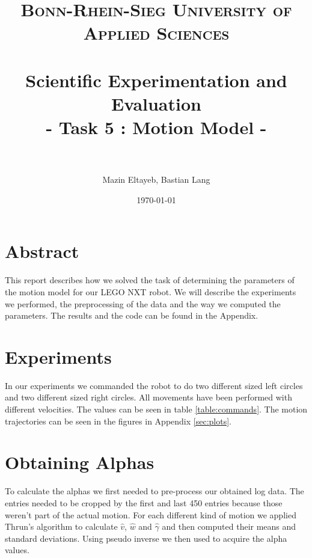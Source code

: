 \documentclass[paper=a4, fontsize=11pt]{scrartcl} %
\title{	
\normalfont \normalsize 
\textsc{Bonn-Rhein-Sieg University of Applied Sciences} \\ [25pt] %
\horrule{0.5pt} \\[0.4cm] %
\huge Scientific Experimentation and Evaluation\\
- Task 5 : Motion Model - \\ 
\horrule{2pt} \\[0.5cm] %
}
\author{Mazin Eltayeb, Bastian Lang} %
\date{\normalsize\today} %
\numberwithin{equation}{section} %
\numberwithin{figure}{section} %
\numberwithin{table}{section} %
\begin{document}
\maketitle %

\tableofcontents
\newpage

\section{Abstract}
This report describes how we solved the task of determining the parameters of the motion model for our LEGO NXT robot. We will describe the experiments we performed, the preprocessing of the data and the way we computed the parameters. The results and the code can be found in the Appendix.

\section{Experiments}
In our experiments we commanded the robot to do two different sized left circles and two different sized right circles. All movements have been performed with different velocities. The values can be seen in table \ref{table:commands}. The motion trajectories can be seen in the figures in Appendix \ref{sec:plots}.



\section{Obtaining Alphas}
To calculate the alphas we first needed to pre-process our obtained log data. The entries needed to be cropped by the first and last 450 entries because those weren't part of the actual motion.
For each different kind of motion we applied Thrun's algorithm to calculate $\hat{v}$, $\hat{w}$ and $\hat{\gamma}$ and then computed their means and standard deviations.
Using pseudo inverse we then used to acquire the alpha values.
\end{document}
